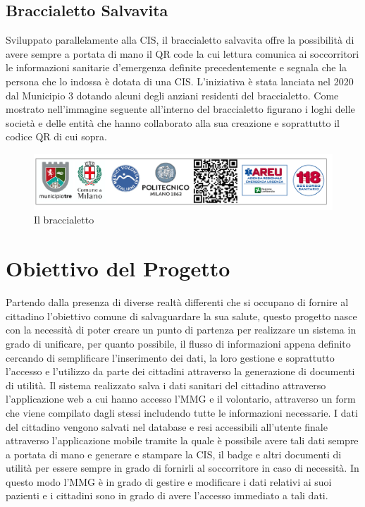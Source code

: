 \documentclass[12pt,a4paper,twoside,openright,titlepage]{book}
\begin{document}
\subsection{Braccialetto Salvavita}
Sviluppato parallelamente alla CIS, il braccialetto salvavita offre la possibilità di avere sempre a portata di mano il QR code la cui lettura comunica ai soccorritori le informazioni sanitarie d'emergenza definite precedentemente e segnala che la persona che lo indossa è dotata di una CIS. L'iniziativa è stata lanciata nel 2020 dal Municipio 3 dotando alcuni degli anziani residenti del braccialetto. Come mostrato nell'immagine seguente all'interno del braccialetto figurano i loghi delle società e delle entità che hanno collaborato alla sua creazione e soprattutto il codice QR di cui sopra.
\begin{figure}[H]
\centering
\includegraphics[scale = 0.4]{braccialetto}
\caption{Il braccialetto}
\end{figure}

\section{Obiettivo del Progetto}
Partendo dalla presenza di diverse realtà differenti che si occupano di fornire al cittadino l'obiettivo comune di salvaguardare la sua salute, questo progetto nasce con la necessità di poter creare un punto di partenza per realizzare un sistema in grado di unificare, per quanto possibile, il flusso di informazioni appena definito cercando di semplificare l'inserimento dei dati, la loro gestione e  soprattutto l'accesso e l'utilizzo da parte dei cittadini attraverso la generazione di documenti di utilità.
Il sistema realizzato salva i dati sanitari del cittadino attraverso l'applicazione web a cui hanno accesso l'MMG e il volontario, attraverso un form che viene compilato dagli stessi includendo tutte le informazioni necessarie. I dati del cittadino vengono salvati nel database e resi accessibili all'utente finale attraverso l'applicazione mobile tramite la quale è possibile avere tali dati sempre a portata di mano e generare e stampare la CIS, il badge e altri documenti di utilità per essere sempre in grado di fornirli al soccorritore in caso di necessità. In questo modo l'MMG è in grado di gestire e modificare i dati relativi ai suoi pazienti e i cittadini sono in grado di avere l'accesso immediato a tali dati.
\end{document}
